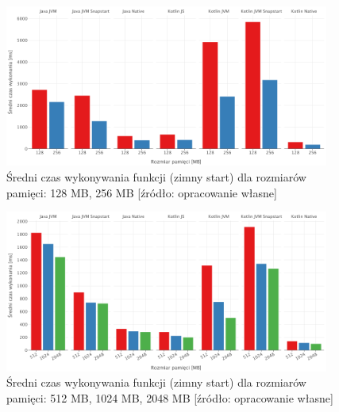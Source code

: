 \begin{figure}[h]
    \centering
    \includegraphics[width=0.95\textwidth]{charts/results/avg-cold-start-128-256.png}
    \caption{Średni czas wykonywania funkcji (zimny start) dla rozmiarów pamięci: 128 MB, 256 MB  [źródło: opracowanie własne]}
    \label{fig:avg_cold_start_128_256}
\end{figure}

\begin{figure}[h]
    \centering
    \includegraphics[width=0.95\textwidth]{charts/results/avg-cold-start-512-2048.png}
    \caption{Średni czas wykonywania funkcji (zimny start) dla rozmiarów pamięci: 512 MB, 1024 MB, 2048 MB  [źródło: opracowanie własne]}
    \label{fig:avg_cold_start_512_2045}
\end{figure}

